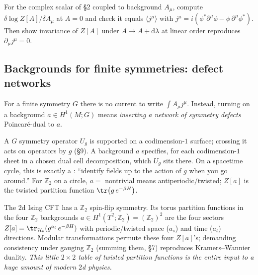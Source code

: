 \documentclass[11pt]{article}
\newcommand{\dd}{\mathrm{d}}                 %
\newcommand{\Ztwo}{\mathbb{Z}_2}
\begin{document}
\begin{xca}
For the complex scalar of \S2 coupled to background $A_\mu$, compute
$\delta \log Z[A]/\delta A_\mu$ at $A=0$ and check it equals $\langle j^\mu\rangle$ with
$j^\mu = i(\phi^*\partial^\mu\phi - \phi\,\partial^\mu\phi^*)$. Then show invariance of
$Z[A]$ under $A\to A+\dd\lambda$ at linear order reproduces $\partial_\mu j^\mu=0$.
\end{xca}

\subsection{Backgrounds for finite symmetries: defect networks}

For a finite symmetry $G$ there is no current to write $\int A_\mu j^\mu$. Instead,
turning on a background $a\in H^1(M;G)$ means \emph{inserting a network of symmetry
defects} Poincar\'e-dual to $a$.

\begin{iintuition}[Background $=$ symmetry-defect network $=$ twisted boundary conditions]
A $G$ symmetry operator $U_g$ is supported on a codimension-$1$ surface; crossing it
acts on operators by $g$ (\S9). A background $a$ specifies, for each codimension-$1$
sheet in a chosen dual cell decomposition, which $U_g$ sits there. On a spacetime cycle,
this is exactly a : ``identify fields up to the action
of $g$ when you go around.'' For $\Ztwo$ on a circle, $a=$ nontrivial means
antiperiodic/twisted; $Z[a]$ is the twisted partition function $\tr\big(g\,e^{-\beta
H}\big)$.
\end{iintuition}

\begin{eexample}
The $2$d Ising CFT has a $\Ztwo$ spin-flip symmetry. Its torus partition functions in
the four $\Ztwo$ backgrounds $a\in H^1(T^2;\Ztwo)=(\Ztwo)^2$ are the four sectors
$Z[a] = \tr_{\mathcal H_b}(g^{a_t}\,e^{-\beta H})$ with periodic/twisted space
($a_s$) and time ($a_t$) directions. Modular transformations permute these four
$Z[a]$'s; demanding consistency under gauging $\Ztwo$ (summing them, \S7) reproduces
Kramers--Wannier duality. \emph{This little $2\times2$ table of twisted partition
functions is the entire input to a huge amount of modern $2$d physics.}
\end{eexample}
\end{document}
